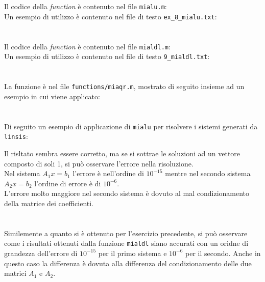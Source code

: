 \documentclass[10pt,a4paper]{article}
\begin{document}
\section{}
Il codice della \textit{function} è contenuto nel file \texttt{mialu.m}:\\
Un esempio di utilizzo è contenuto nel file di testo \texttt{ex\_8\_mialu.txt}:

\section{}
Il codice della \textit{function} è contenuto nel file \texttt{mialdl.m}:\\
Un esempio di utilizzo è contenuto nel file di testo \texttt{9\_mialdl.txt}:
\section{}
La funzione è nel file \texttt{functions/miaqr.m}, mostrato di seguito insieme ad un esempio in cui viene applicato:


\pagebreak
\section{}
Di seguito un esempio di applicazione di \texttt{mialu} per risolvere i sistemi generati da \texttt{linsis}:

Il risltato sembra essere corretto, ma se si sottrae le soluzioni ad un vettore composto di soli 1, si può osservare l'errore nella risoluzione.\\
Nel sistema $A_1x=b_1$ l'errore è nell'ordine di $10^{-15}$ mentre nel secondo sistema $A_2x=b_2$ l'ordine di errore è di $10^{-6}$.\\
L'errore molto maggiore nel secondo sistema è dovuto al mal condizionamento della matrice dei coefficienti.

\section{}
Similemente a quanto si è ottenuto per l'esercizio precedente, si può osservare come i risultati ottenuti dalla funzione \texttt{mialdl} siano accurati con un oridne di grandezza dell'errore di $10^{-15}$ per il primo sistema e $10^{-6}$ per il secondo. Anche in questo caso la differenza è dovuta alla differenza del condizionamento delle due matrici $A_1$ e $A_2$.

\end{document}

